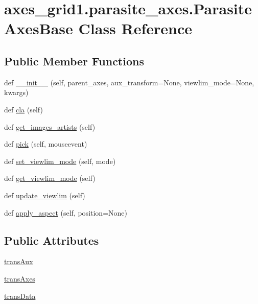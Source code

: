 \hypertarget{classaxes__grid1_1_1parasite__axes_1_1ParasiteAxesBase}{}\section{axes\+\_\+grid1.\+parasite\+\_\+axes.\+Parasite\+Axes\+Base Class Reference}
\label{classaxes__grid1_1_1parasite__axes_1_1ParasiteAxesBase}
\subsection*{Public Member Functions}
\begin{DoxyCompactItemize}
\item 
def \hyperlink{classaxes__grid1_1_1parasite__axes_1_1ParasiteAxesBase_afa0582d5c61dd96a0c9856abe0649364}{\+\_\+\+\_\+init\+\_\+\+\_\+} (self, parent\+\_\+axes, aux\+\_\+transform=None, viewlim\+\_\+mode=None, kwargs)
\item 
def \hyperlink{classaxes__grid1_1_1parasite__axes_1_1ParasiteAxesBase_aa8e70a2b8091c1e849a8b7ddd9502edf}{cla} (self)
\item 
def \hyperlink{classaxes__grid1_1_1parasite__axes_1_1ParasiteAxesBase_a1523c286a23d5a63d866e7ad29868085}{get\+\_\+images\+\_\+artists} (self)
\item 
def \hyperlink{classaxes__grid1_1_1parasite__axes_1_1ParasiteAxesBase_a5b348c9d27bdeb2b8fa4d242f26765cd}{pick} (self, mouseevent)
\item 
def \hyperlink{classaxes__grid1_1_1parasite__axes_1_1ParasiteAxesBase_a8df258e3238b53666372120a4583328f}{set\+\_\+viewlim\+\_\+mode} (self, mode)
\item 
def \hyperlink{classaxes__grid1_1_1parasite__axes_1_1ParasiteAxesBase_ab98aca5c7ada674d9532b38f00a2ec0d}{get\+\_\+viewlim\+\_\+mode} (self)
\item 
def \hyperlink{classaxes__grid1_1_1parasite__axes_1_1ParasiteAxesBase_a94d78df6d61d391c0ee3b6337b7bb73c}{update\+\_\+viewlim} (self)
\item 
def \hyperlink{classaxes__grid1_1_1parasite__axes_1_1ParasiteAxesBase_ab671a73a0a93ec73f2bd6655f63bf57b}{apply\+\_\+aspect} (self, position=None)
\end{DoxyCompactItemize}
\subsection*{Public Attributes}
\begin{DoxyCompactItemize}
\item 
\hyperlink{classaxes__grid1_1_1parasite__axes_1_1ParasiteAxesBase_ae555655a9269a9f7f8459ff81d2fade6}{trans\+Aux}
\item 
\hyperlink{classaxes__grid1_1_1parasite__axes_1_1ParasiteAxesBase_a9272d51bb707671bf3aea42ad50696ed}{trans\+Axes}
\item 
\hyperlink{classaxes__grid1_1_1parasite__axes_1_1ParasiteAxesBase_a2741c4c031158e7070973c74d3945acd}{trans\+Data}
\end{DoxyCompactItemize}
